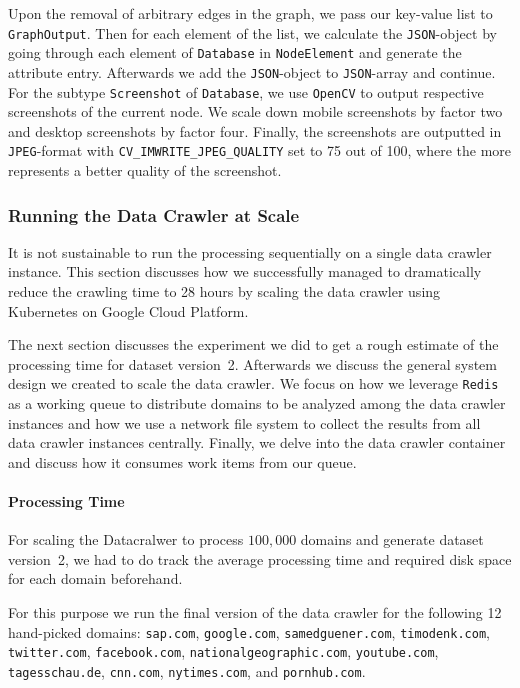 Upon the removal of arbitrary edges in the graph, we pass our key-value list to \texttt{GraphOutput}. Then for each element of the list, we calculate the \texttt{JSON}-object by going through each element of \texttt{Database} in \texttt{NodeElement} and generate the attribute entry. Afterwards we add the \texttt{JSON}-object to \texttt{JSON}-array and continue. For the subtype \texttt{Screenshot} of \texttt{Database}, we use \texttt{OpenCV} to output respective screenshots of the current node. We scale down mobile screenshots by factor two and desktop screenshots by factor four. Finally, the screenshots are outputted in \texttt{JPEG}-format with \texttt{CV\_IMWRITE\_JPEG\_QUALITY} set to 75 out of 100, where the more represents a better quality of the screenshot. 

\subsubsection{Running the Data Crawler at Scale}
\label{datacrawler_scale}
It is not sustainable to run the processing sequentially on a single data crawler instance. This section discusses how we successfully managed to dramatically reduce the crawling time to 28 hours by scaling the data crawler using Kubernetes on Google Cloud Platform. 

The next section discusses the experiment we did to get a rough estimate of the processing time for dataset version~2. Afterwards we discuss the general system design we created to scale the data crawler. We focus on how we leverage \texttt{Redis} as a working queue to distribute domains to be analyzed among the data crawler instances and how we use a network file system to collect the results from all data crawler instances centrally. Finally, we delve into the data crawler container and discuss how it consumes work items from our queue.

\paragraph*{Processing Time}
\label{datacrawler_processing_time}
For scaling the Datacralwer to process $100,000$ domains and generate dataset version~2, we had to do track the average processing time and required disk space for each domain beforehand.

For this purpose we run the final version of the data crawler for the following 12 hand-picked domains: \texttt{sap.com}, \texttt{google.com}, \texttt{samedguener.com}, \texttt{timodenk.com}, \texttt{twitter.com}, \texttt{facebook.com}, \texttt{nationalgeographic.com}, \texttt{youtube.com}, \texttt{tagesschau.de}, \texttt{cnn.com}, \texttt{nytimes.com}, and \texttt{pornhub.com}.

